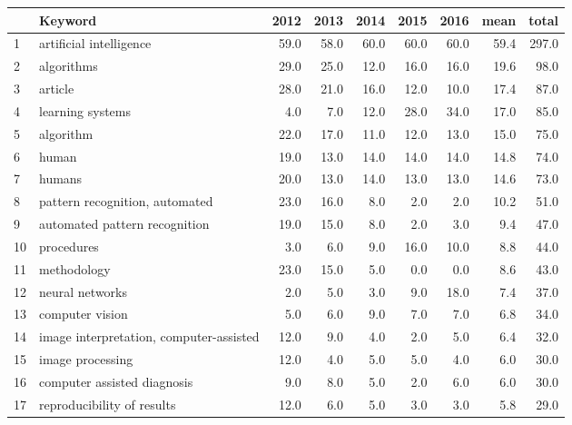 \begin{tabular}{llrrrrrrr}
\toprule
{} &                                  Keyword &  2012 &  2013 &  2014 &  2015 &  2016 &  mean &  total \\
\midrule
1  &                  artificial intelligence &  59.0 &  58.0 &  60.0 &  60.0 &  60.0 &  59.4 &  297.0 \\
2  &                               algorithms &  29.0 &  25.0 &  12.0 &  16.0 &  16.0 &  19.6 &   98.0 \\
3  &                                  article &  28.0 &  21.0 &  16.0 &  12.0 &  10.0 &  17.4 &   87.0 \\
4  &                         learning systems &   4.0 &   7.0 &  12.0 &  28.0 &  34.0 &  17.0 &   85.0 \\
5  &                                algorithm &  22.0 &  17.0 &  11.0 &  12.0 &  13.0 &  15.0 &   75.0 \\
6  &                                    human &  19.0 &  13.0 &  14.0 &  14.0 &  14.0 &  14.8 &   74.0 \\
7  &                                   humans &  20.0 &  13.0 &  14.0 &  13.0 &  13.0 &  14.6 &   73.0 \\
8  &           pattern recognition, automated &  23.0 &  16.0 &   8.0 &   2.0 &   2.0 &  10.2 &   51.0 \\
9  &            automated pattern recognition &  19.0 &  15.0 &   8.0 &   2.0 &   3.0 &   9.4 &   47.0 \\
10 &                               procedures &   3.0 &   6.0 &   9.0 &  16.0 &  10.0 &   8.8 &   44.0 \\
11 &                              methodology &  23.0 &  15.0 &   5.0 &   0.0 &   0.0 &   8.6 &   43.0 \\
12 &                          neural networks &   2.0 &   5.0 &   3.0 &   9.0 &  18.0 &   7.4 &   37.0 \\
13 &                          computer vision &   5.0 &   6.0 &   9.0 &   7.0 &   7.0 &   6.8 &   34.0 \\
14 &  image interpretation, computer-assisted &  12.0 &   9.0 &   4.0 &   2.0 &   5.0 &   6.4 &   32.0 \\
15 &                         image processing &  12.0 &   4.0 &   5.0 &   5.0 &   4.0 &   6.0 &   30.0 \\
16 &              computer assisted diagnosis &   9.0 &   8.0 &   5.0 &   2.0 &   6.0 &   6.0 &   30.0 \\
17 &               reproducibility of results &  12.0 &   6.0 &   5.0 &   3.0 &   3.0 &   5.8 &   29.0 \\

\end{tabular}
